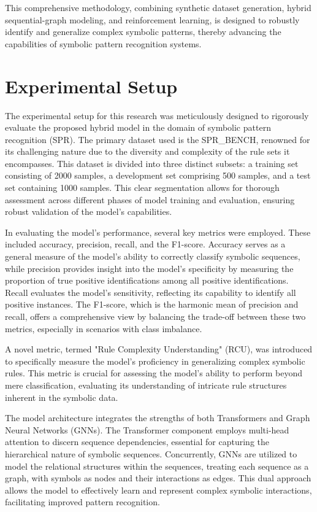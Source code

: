 \documentclass{article}
\begin{document}
This comprehensive methodology, combining synthetic dataset generation, hybrid sequential-graph modeling, and reinforcement learning, is designed to robustly identify and generalize complex symbolic patterns, thereby advancing the capabilities of symbolic pattern recognition systems.

\section{Experimental Setup}
The experimental setup for this research was meticulously designed to rigorously evaluate the proposed hybrid model in the domain of symbolic pattern recognition (SPR). The primary dataset used is the SPR\_BENCH, renowned for its challenging nature due to the diversity and complexity of the rule sets it encompasses. This dataset is divided into three distinct subsets: a training set consisting of 2000 samples, a development set comprising 500 samples, and a test set containing 1000 samples. This clear segmentation allows for thorough assessment across different phases of model training and evaluation, ensuring robust validation of the model's capabilities.

In evaluating the model's performance, several key metrics were employed. These included accuracy, precision, recall, and the F1-score. Accuracy serves as a general measure of the model's ability to correctly classify symbolic sequences, while precision provides insight into the model's specificity by measuring the proportion of true positive identifications among all positive identifications. Recall evaluates the model's sensitivity, reflecting its capability to identify all positive instances. The F1-score, which is the harmonic mean of precision and recall, offers a comprehensive view by balancing the trade-off between these two metrics, especially in scenarios with class imbalance.

A novel metric, termed "Rule Complexity Understanding" (RCU), was introduced to specifically measure the model's proficiency in generalizing complex symbolic rules. This metric is crucial for assessing the model's ability to perform beyond mere classification, evaluating its understanding of intricate rule structures inherent in the symbolic data.

The model architecture integrates the strengths of both Transformers and Graph Neural Networks (GNNs). The Transformer component employs multi-head attention to discern sequence dependencies, essential for capturing the hierarchical nature of symbolic sequences. Concurrently, GNNs are utilized to model the relational structures within the sequences, treating each sequence as a graph, with symbols as nodes and their interactions as edges. This dual approach allows the model to effectively learn and represent complex symbolic interactions, facilitating improved pattern recognition.
\end{document}

